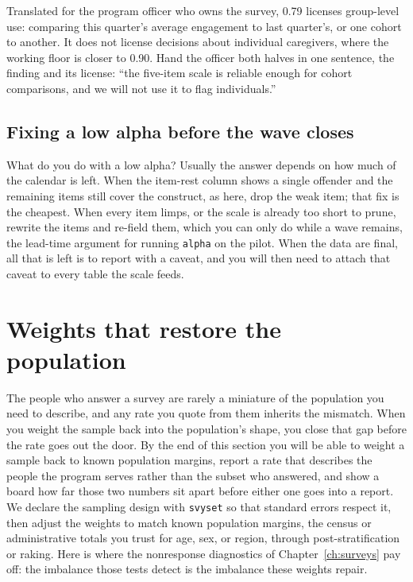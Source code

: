 \documentclass[
    a4paper,
    fontsize=10pt,
    twoside=true,
    numbers=noenddot,
]{kaobook}
\begin{document}
Translated for the program officer who owns the survey, 0.79 licenses group-level use: comparing this quarter's average engagement to last quarter's, or one cohort to another. It does not license decisions about individual caregivers, where the working floor is closer to 0.90. Hand the officer both halves in one sentence, the finding and its license: \enquote{the five-item scale is reliable enough for cohort comparisons, and we will not use it to flag individuals.}

\subsection{Fixing a low alpha before the wave closes}\label{sec:alpha-fix}
What do you do with a low alpha? Usually the answer depends on how much of the calendar is left. When the item-rest column shows a single offender and the remaining items still cover the construct, as here, drop the weak item; that fix is the cheapest. When every item limps, or the scale is already too short to prune, rewrite the items and re-field them, which you can only do while a wave remains, the lead-time argument for running \texttt{alpha} on the pilot. When the data are final, all that is left is to report with a caveat, and you will then need to attach that caveat to every table the scale feeds.

\section{Weights that restore the population}\label{sec:weights}
The people who answer a survey are rarely a miniature of the population you need to describe, and any rate you quote from them inherits the mismatch. When you weight the sample back into the population's shape, you close that gap before the rate goes out the door. By the end of this section you will be able to weight a sample back to known population margins, report a rate that describes the people the program serves rather than the subset who answered, and show a board how far those two numbers sit apart before either one goes into a report. We declare the sampling design with \texttt{svyset} so that standard errors respect it, then adjust the weights to match known population margins, the census or administrative totals you trust for age, sex, or region, through post-stratification or raking. Here is where the nonresponse diagnostics of Chapter~\ref{ch:surveys} pay off: the imbalance those tests detect is the imbalance these weights repair.
\end{document}
